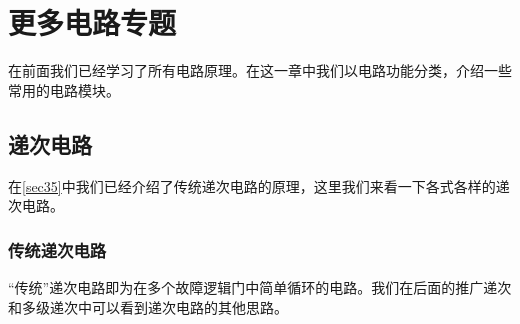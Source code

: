 \chapter{更多电路专题}

在前面我们已经学习了所有电路原理。在这一章中我们以电路功能分类，介绍一些常用的电路模块。

\section{递次电路}\label{sec2}
在\autoref{sec35}中我们已经介绍了传统递次电路的原理，这里我们来看一下各式各样的递次电路。

\subsection{传统递次电路}
“传统”递次电路即为在多个故障逻辑门中简单循环的电路。我们在后面的推广递次和多级递次中可以看到递次电路的其他思路。

